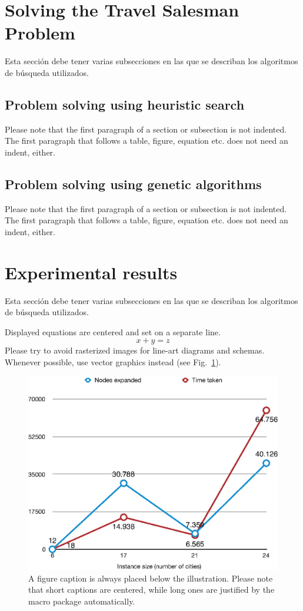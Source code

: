 \documentclass[runningheads]{llncs}
\begin{document}
%
%
%
\section{Solving the Travel Salesman Problem}
Esta sección debe tener varias subsecciones en las que se describan los algoritmos de búsqueda utilizados.

\subsection{Problem solving using heuristic search}
Please note that the first paragraph of a section or subsection is
not indented. The first paragraph that follows a table, figure,
equation etc. does not need an indent, either.

\subsection{Problem solving using genetic algorithms}
Please note that the first paragraph of a section or subsection is
not indented. The first paragraph that follows a table, figure,
equation etc. does not need an indent, either.

%
%
%
\section{Experimental results}
Esta sección debe tener varias subsecciones en las que se describan los algoritmos de búsqueda utilizados.



\noindent Displayed equations are centered and set on a separate
line.
\begin{equation}
x + y = z
\end{equation}
Please try to avoid rasterized images for line-art diagrams and
schemas. Whenever possible, use vector graphics instead (see
Fig.~\ref{fig1}).

\begin{figure}
\includegraphics[width=\textwidth]{prueba.eps}
\caption{A figure caption is always placed below the illustration.
Please note that short captions are centered, while long ones are
justified by the macro package automatically.} \label{fig1}
\end{figure}
\end{document}
